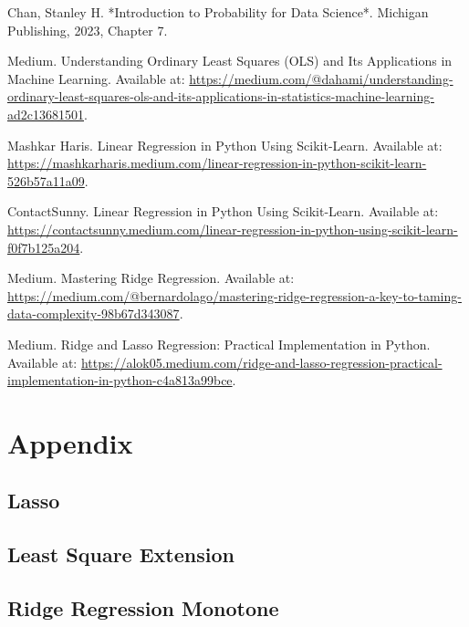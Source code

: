 \documentclass{article}
\begin{document}
\begin{thebibliography}{99}
 Chan, Stanley H. *Introduction to Probability for Data Science*. Michigan Publishing, 2023, Chapter 7.

 Medium. Understanding Ordinary Least Squares (OLS) and Its Applications in Machine Learning. Available at: \url{https://medium.com/@dahami/understanding-ordinary-least-squares-ols-and-its-applications-in-statistics-machine-learning-ad2c13681501}.

 Mashkar Haris. Linear Regression in Python Using Scikit-Learn. Available at: \url{https://mashkarharis.medium.com/linear-regression-in-python-scikit-learn-526b57a11a09}.

 ContactSunny. Linear Regression in Python Using Scikit-Learn. Available at: \url{https://contactsunny.medium.com/linear-regression-in-python-using-scikit-learn-f0f7b125a204}.

 Medium. Mastering Ridge Regression. Available at: \url{https://medium.com/@bernardolago/mastering-ridge-regression-a-key-to-taming-data-complexity-98b67d343087}.

 Medium. Ridge and Lasso Regression: Practical Implementation in Python. Available at: \url{https://alok05.medium.com/ridge-and-lasso-regression-practical-implementation-in-python-c4a813a99bce}.

\end{thebibliography}







\appendix
\section{Appendix}



\subsection{Lasso}\label{appendix:1}



\subsection{Least Square Extension}\label{appendix:2}



\subsection{Ridge Regression Monotone}\label{appendix:3}

\end{document}
